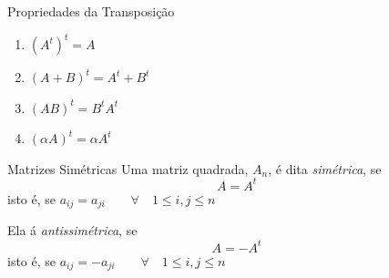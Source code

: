 \documentclass[fleqn,aspectratio=169,12pt]{beamer}
\begin{document}
\begin{frame}{Propriedades da Transposição}
  \begin{enumerate}[<+->][(i)\;]
  \itemsep=1.3em
    \item $\left(A^t\right)^t = A$
    \item $(A + B)^{t} = A^{t} + B^{t}$
    \item $(AB)^{t} = B^t A^t$
    \item $(\alpha A)^{t} = \alpha A^{t} $
  \end{enumerate}
\end{frame}






\begin{frame}{Matrizes Simétricas}
  Uma matriz quadrada, $A_n$, é dita \emph{simétrica},
  \pause
  se
  \[
    A = A^t
  \]
  \pause
  isto é, se
  \quad
  \(
    a_{ij} = a_{ji}
    \qquad
    \forall \quad 1 \leq i,j \leq n
  \)

  \pause
  \bigskip
  Ela á \emph{antissimétrica},
  \pause
  se
  \[
    A = -A^t
  \]
  \pause
  isto é, se
  \quad
  \(
    a_{ij} = -a_{ji}
    \qquad
    \forall \quad 1 \leq i,j \leq n
  \)
\end{frame}




% 
% 

\end{document}
